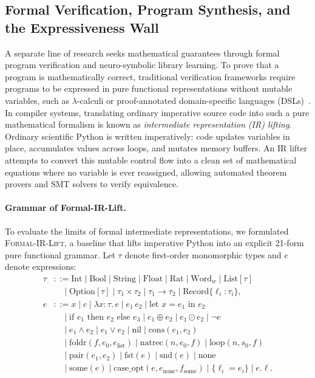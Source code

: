 \documentclass[10pt,twocolumn]{article}
\begin{document}
\subsection{Formal Verification, Program Synthesis, and the Expressiveness Wall}
A separate line of research seeks mathematical guarantees through formal program verification and neuro-symbolic library learning. To prove that a program is mathematically correct, traditional verification frameworks require programs to be expressed in pure functional representations without mutable variables, such as $\lambda$-calculi or proof-annotated domain-specific languages (DSLs)~\cite{ellis2021dreamcoder,bowers2023stitch,grand2024lilo,leino2010dafny,lattuada2023verus,moura2021lean4}. In compiler systems, translating ordinary imperative source code into such a pure mathematical formalism is known as \emph{intermediate representation (IR) lifting}. Ordinary scientific Python is written imperatively: code updates variables in place, accumulates values across loops, and mutates memory buffers. An IR lifter attempts to convert this mutable control flow into a clean set of mathematical equations where no variable is ever reassigned, allowing automated theorem provers and SMT solvers to verify equivalence.

\paragraph{Grammar of Formal-IR-Lift.}
To evaluate the limits of formal intermediate representations, we formulated \textsc{Formal-IR-Lift}, a baseline that lifts imperative Python into an explicit 21-form pure functional grammar. Let $\tau$ denote first-order monomorphic types and $e$ denote expressions:
\begin{equation}
\begin{aligned}
\tau &::= \text{Int} \mid \text{Bool} \mid \text{String} \mid \text{Float} \mid \text{Rat} \mid \text{Word}_w \mid \text{List}[\tau] \\
&\quad\mid \text{Option}[\tau] \mid \tau_1 \times \tau_2 \mid \tau_1 \to \tau_2 \mid \text{Record}\{\ell_i: \tau_i\}, \\
e &::= x \mid c \mid \lambda x:\tau.\, e \mid e_1\, e_2 \mid \text{let } x = e_1 \text{ in } e_2 \\
&\quad\mid \text{if } e_1 \text{ then } e_2 \text{ else } e_3 \mid e_1 \oplus e_2 \mid e_1 \odot e_2 \mid \neg e \\
&\quad\mid e_1 \land e_2 \mid e_1 \lor e_2 \mid \text{nil} \mid \text{cons}(e_1, e_2) \\
&\quad\mid \text{foldr}(f, e_0, e_{\text{list}}) \mid \text{natrec}(n, e_0, f) \mid \text{loop}(n, s_0, f) \\
&\quad\mid \text{pair}(e_1, e_2) \mid \text{fst}(e) \mid \text{snd}(e) \mid \text{none} \\
&\quad\mid \text{some}(e) \mid \text{case\_opt}(e, e_{\text{none}}, f_{\text{some}}) \mid \{\ell_i = e_i\} \mid e.\ell.
\end{aligned}
\label{eq:formal_ir_grammar}
\end{equation}
\end{document}

